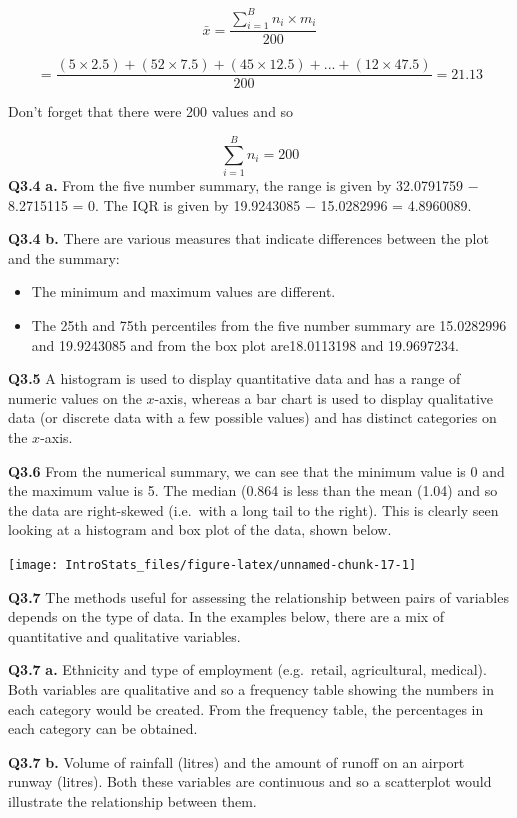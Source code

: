\documentclass[
  oneside]{krantz}
\begin{document}
\[\bar x = \frac{\sum_{i=1}^B n_i \times m_i}{200} \]

\[  = \frac{(5 \times 2.5) + (52 \times 7.5) + (45 \times 12.5) + ... + (12 \times 47.5)}{200} = 21.13\]

Don't forget that there were 200 values and so

\[\sum_{i=1}^B n_i = 200 \]
\textbf{Q3.4} \textbf{a.} From the five number summary, the range is given by 32.0791759 \(-\) 8.2715115 = 0. The IQR is given by 19.9243085 \(-\) 15.0282996 = 4.8960089.

\textbf{Q3.4} \textbf{b.} There are various measures that indicate differences between the plot and the summary:

\begin{itemize}
\item
  The minimum and maximum values are different.
\item
  The 25th and 75th percentiles from the five number summary are 15.0282996 and 19.9243085 and from the box plot are18.0113198 and 19.9697234.
\end{itemize}

\textbf{Q3.5} A histogram is used to display quantitative data and has a range of numeric values on the \(x\)-axis, whereas a bar chart is used to display qualitative data (or discrete data with a few possible values) and has distinct categories on the \(x\)-axis.

\textbf{Q3.6} From the numerical summary, we can see that the minimum value is 0 and the maximum value is 5. The median (0.864 is less than the mean (1.04) and so the data are right-skewed (i.e.~with a long tail to the right). This is clearly seen looking at a histogram and box plot of the data, shown below.

\begin{center}\texttt{[image: IntroStats\_files/figure-latex/unnamed-chunk-17-1]} \end{center}

\textbf{Q3.7} The methods useful for assessing the relationship between pairs of variables depends on the type of data. In the examples below, there are a mix of quantitative and qualitative variables.

\textbf{Q3.7} \textbf{a.} Ethnicity and type of employment (e.g.~retail, agricultural, medical). Both variables are qualitative and so a frequency table showing the numbers in each category would be created. From the frequency table, the percentages in each category can be obtained.

\textbf{Q3.7} \textbf{b.} Volume of rainfall (litres) and the amount of runoff on an airport runway (litres). Both these variables are continuous and so a scatterplot would illustrate the relationship between them.
\end{document}

